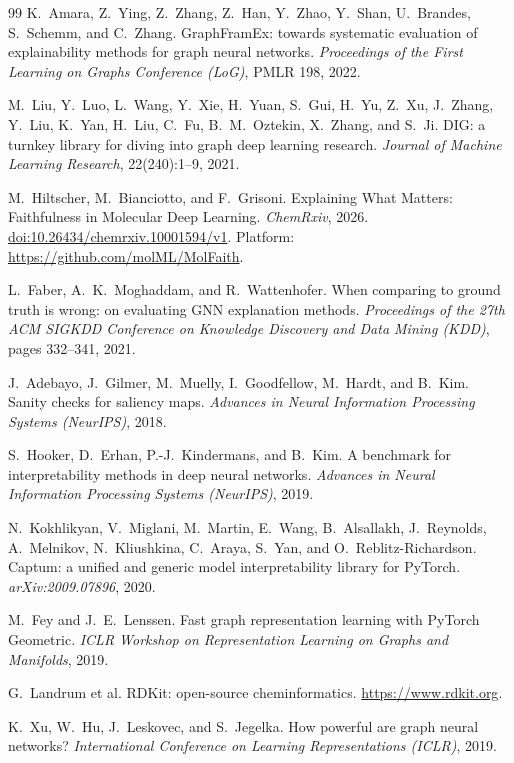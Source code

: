 \begin{thebibliography}{99}
 K.~Amara, Z.~Ying, Z.~Zhang, Z.~Han, Y.~Zhao, Y.~Shan,
U.~Brandes, S.~Schemm, and C.~Zhang. GraphFramEx: towards systematic evaluation
of explainability methods for graph neural networks. \emph{Proceedings of the
First Learning on Graphs Conference (LoG)}, PMLR 198, 2022.

 M.~Liu, Y.~Luo, L.~Wang, Y.~Xie, H.~Yuan, S.~Gui, H.~Yu, Z.~Xu,
J.~Zhang, Y.~Liu, K.~Yan, H.~Liu, C.~Fu, B.~M.~Oztekin, X.~Zhang, and S.~Ji.
DIG: a turnkey library for diving into graph deep learning research.
\emph{Journal of Machine Learning Research}, 22(240):1--9, 2021.

 M.~Hiltscher, M.~Bianciotto, and F.~Grisoni. Explaining
What Matters: Faithfulness in Molecular Deep Learning. \emph{ChemRxiv}, 2026.
\href{https://doi.org/10.26434/chemrxiv.10001594/v1}
{doi:10.26434/chemrxiv.10001594/v1}. Platform: \url{https://github.com/molML/MolFaith}.

 L.~Faber, A.~K.~Moghaddam, and R.~Wattenhofer. When comparing
to ground truth is wrong: on evaluating GNN explanation methods.
\emph{Proceedings of the 27th ACM SIGKDD Conference on Knowledge Discovery and
Data Mining (KDD)}, pages 332--341, 2021.

 J.~Adebayo, J.~Gilmer, M.~Muelly, I.~Goodfellow,
M.~Hardt, and B.~Kim. Sanity checks for saliency maps. \emph{Advances in Neural
Information Processing Systems (NeurIPS)}, 2018.

 S.~Hooker, D.~Erhan, P.-J.~Kindermans, and B.~Kim. A benchmark
for interpretability methods in deep neural networks. \emph{Advances in Neural
Information Processing Systems (NeurIPS)}, 2019.

 N.~Kokhlikyan, V.~Miglani, M.~Martin, E.~Wang, B.~Alsallakh,
J.~Reynolds, A.~Melnikov, N.~Kliushkina, C.~Araya, S.~Yan, and O.~Reblitz-Richardson.
Captum: a unified and generic model interpretability library for PyTorch.
\emph{arXiv:2009.07896}, 2020.

 M.~Fey and J.~E.~Lenssen. Fast graph representation learning with
PyTorch Geometric. \emph{ICLR Workshop on Representation Learning on Graphs and
Manifolds}, 2019.

 G.~Landrum et al. RDKit: open-source cheminformatics.
\url{https://www.rdkit.org}.

 K.~Xu, W.~Hu, J.~Leskovec, and S.~Jegelka. How powerful are graph
neural networks? \emph{International Conference on Learning Representations
(ICLR)}, 2019.


\end{thebibliography}
